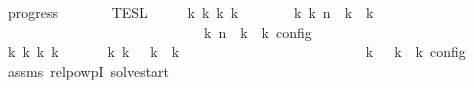 \begin{isabellebody}
\isamarkupfalse%
\ progress{\isacharcolon}\isanewline
\ \ \ {\isacartoucheopen}{\isasymrho}\ {\isasymin}\ {\isasymlbrakk}{\isasymlbrakk}\ {\isasymPsi}\ {\isasymrbrakk}{\isasymrbrakk}\isactrlsub T\isactrlsub E\isactrlsub S\isactrlsub L{\isacartoucheclose}\isanewline
\ \ \ \ \ {\isacartoucheopen}{\isasymexists}k\ {\isasymGamma}\isactrlsub k\ {\isasymPsi}\isactrlsub k\ {\isasymPhi}\isactrlsub k{\isachardot}\ {\isacharparenleft}{\isacharparenleft}{\isacharbrackleft}{\isacharbrackright}{\isacharcomma}\ {}\ {\isasymturnstile}\ {\isasymPsi}\ {\isasymtriangleright}\ {\isacharbrackleft}{\isacharbrackright}{\isacharparenright}\ \ {\isasymhookrightarrow}\isactrlbsup k\isactrlesup \ {\isacharparenleft}{\isasymGamma}\isactrlsub k{\isacharcomma}\ n\ {\isasymturnstile}\ {\isasymPsi}\isactrlsub k\ {\isasymtriangleright}\ {\isasymPhi}\isactrlsub k{\isacharparenright}{\isacharparenright}\isanewline
\ \ \ \ \ \ \ \ \ \ \ \ \ \ \ \ \ \ \ \ \ \ \ \ \ {\isasymand}\ {\isasymrho}\ {\isasymin}\ {\isasymlbrakk}\ {\isasymGamma}\isactrlsub k{\isacharcomma}\ n\ {\isasymturnstile}\ {\isasymPsi}\isactrlsub k\ {\isasymtriangleright}\ {\isasymPhi}\isactrlsub k\ {\isasymrbrakk}\isactrlsub c\isactrlsub o\isactrlsub n\isactrlsub f\isactrlsub i\isactrlsub g{\isacartoucheclose}\isanewline
%
\isadelimproof
%
\endisadelimproof
%
\isatagproof
{}\isamarkupfalse%
\ {\isacharminus}\isanewline
\ \ \isamarkupfalse%
\ {}{\isacharcolon}{\isacartoucheopen}{\isasymexists}{\isasymGamma}\isactrlsub k\ {\isasymPsi}\isactrlsub k\ {\isasymPhi}\isactrlsub k\ k{\isachardot}\ {\isacharparenleft}{\isacharparenleft}{\isacharbrackleft}{\isacharbrackright}{\isacharcomma}\ {}\ {\isasymturnstile}\ {\isasymPsi}\ {\isasymtriangleright}\ {\isacharbrackleft}{\isacharbrackright}{\isacharparenright}\ {\isasymhookrightarrow}\isactrlbsup k\isactrlesup \ {\isacharparenleft}{\isasymGamma}\isactrlsub k{\isacharcomma}\ {}\ {\isasymturnstile}\ {\isasymPsi}\isactrlsub k\ {\isasymtriangleright}\ {\isasymPhi}\isactrlsub k{\isacharparenright}{\isacharparenright}\isanewline
\ \ \ \ \ \ \ \ \ \ \ \ \ \ \ \ \ \ \ \ \ \ {\isasymand}\ {\isasymrho}\ {\isasymin}\ {\isasymlbrakk}\ {\isasymGamma}\isactrlsub k{\isacharcomma}\ {}\ {\isasymturnstile}\ {\isasymPsi}\isactrlsub k\ {\isasymtriangleright}\ {\isasymPhi}\isactrlsub k\ {\isasymrbrakk}\isactrlsub c\isactrlsub o\isactrlsub n\isactrlsub f\isactrlsub i\isactrlsub g{\isacartoucheclose}\isanewline
\ \ \ \ \isamarkupfalse%
\ assms\ relpowp{\isacharunderscore}{}{\isacharunderscore}I\ solve{\isacharunderscore}start\ \isamarkupfalse%

\end{isabellebody}
